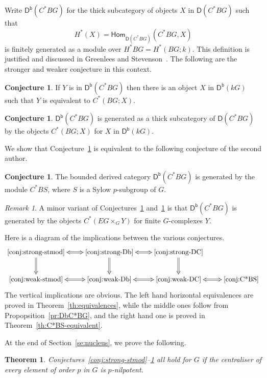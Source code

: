 \documentclass[12pt]{amsart}
\newcommand{\DD}{\mathsf{D}}%
\newcommand{\Db}{\DD^{\mathsf{b}}}%
\newcommand{\Hom}{\mathsf{Hom}}
\newcommand{\kG}{\kk G}
\newcommand{\kk}{k}
\numberwithin{equation}{section}
\theoremstyle{plain}
\newtheorem{theorem}[equation]{Theorem}
\theoremstyle{definition}
\newtheorem{conjecture}[equation]{Conjecture}
\theoremstyle{remark}
\newtheorem{remark}[equation]{Remark}
\begin{document}
Write $\Db(C^*BG)$ for the thick subcategory of objects $X$ in
$\DD(C^*BG)$ such that
\[ H^*(X)=\Hom_{\DD(C^*BG)}(C^*BG,X) \] 
is finitely generated as a module over $H^*BG=H^*(BG;\kk)$. This
definition is justified and discussed in Greenlees and
Stevenson~\cite{Greenlees/Stevenson:2020a}. The following are the
stronger and weaker conjecture in this context.


\begin{conjecture}\label{conj:strong-DC}
If $Y$ is in $\Db(C^*BG)$ then there is an object $X$ in $\Db(\kG)$
such that $Y$ is equivalent to $C^*(BG;X)$.
\end{conjecture}


\begin{conjecture}\label{conj:weak-DC}
$\Db(C^*BG)$ is generated as a thick subcategory of $\DD(C^*BG)$ by the objects
$C^*(BG;X)$ for $X$ in $\Db(\kG)$.
\end{conjecture}


We show that Conjecture~\ref{conj:weak-DC} is equivalent to
the following conjecture of the second author.

\begin{conjecture}\label{conj:C*BS}
The bounded derived category $\Db(C^*BG)$ is generated by the
module $C^*BS$, where $S$ is a Sylow $p$-subgroup of $G$.
\end{conjecture}


\begin{remark}
A minor variant of Conjectures~\ref{conj:weak-DC} and~\ref{conj:C*BS}
is that $\Db(C^*BG)$ 
is generated by the objects $C^*(EG\times_G Y)$ for finite
$G$-complexes $Y$.
\end{remark}



Here is a diagram of the implications between the various conjectures.
\[ \xymatrix{\ref{conj:strong-stmod} \ar@{<=>}[r]\ar@{=>}[d] &
\ref{conj:strong-Db} \ar@{<=>}[r]\ar@{=>}[d] & 
\ref{conj:strong-DC}\ar@{=>}[d]\\
\ref{conj:weak-stmod}\ar@{<=>}[r] & 
\ref{conj:weak-Db}\ar@{<=>}[r] &
\ref{conj:weak-DC}\ar@{<=>}[r] & 
\ref{conj:C*BS}} \]
The vertical implications are obvious. The left hand horizontal equivalences are
proved in Theorem~\ref{th:equivalences}, while the middle ones
follow from Propopsition~\ref{pr:DbC*BG}, and the right hand one is
proved in Theorem~\ref{th:C*BS-equivalent}.

At the end of
Section~\ref{se:nucleus}, we prove the  following.

\begin{theorem}\label{th:C*BS-nonucleus}
  Conjectures~\ref{conj:strong-stmod}--\ref{conj:C*BS} all
  hold for $G$ if the centraliser of every element
  of order $p$ in $G$ is $p$-nilpotent.
\end{theorem}
\end{document}
